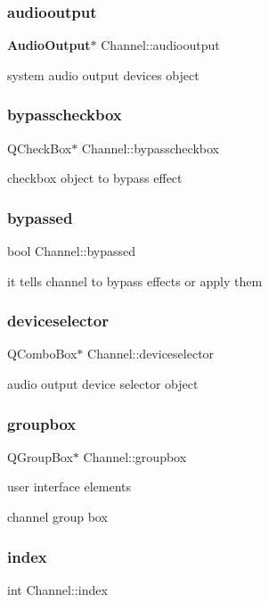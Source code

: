 \subsubsection{audiooutput}
{\footnotesize\ttfamily \textbf{ Audio\+Output}$\ast$ Channel\+::audiooutput}

system audio output devices object \mbox{\label{class_channel_a285eab1752d5e9407e1bc1e75353df34}} 
\subsubsection{bypasscheckbox}
{\footnotesize\ttfamily Q\+Check\+Box$\ast$ Channel\+::bypasscheckbox}

checkbox object to bypass effect \mbox{\label{class_channel_a94507945240717f2570e3baadd02d08a}} 
\subsubsection{bypassed}
{\footnotesize\ttfamily bool Channel\+::bypassed}

it tells channel to bypass effects or apply them \mbox{\label{class_channel_a9dcb50dc41866fbe60424553f1b910fa}} 
\subsubsection{deviceselector}
{\footnotesize\ttfamily Q\+Combo\+Box$\ast$ Channel\+::deviceselector}

audio output device selector object \mbox{\label{class_channel_a99287738754d9e20c0ca639d6d26f28c}} 
\subsubsection{groupbox}
{\footnotesize\ttfamily Q\+Group\+Box$\ast$ Channel\+::groupbox}



user interface elements 

channel group box \mbox{\label{class_channel_a992b8f195f395a64b4e966886bb41f00}} 
\subsubsection{index}
{\footnotesize\ttfamily int Channel\+::index}

